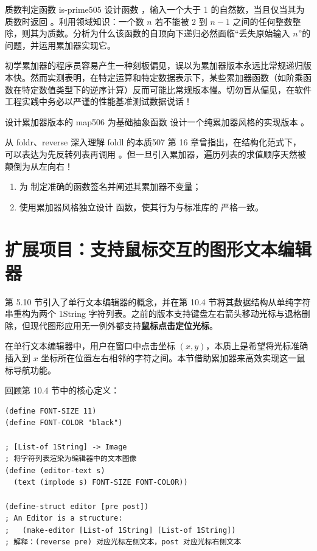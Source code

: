 \begin{exercise}{质数判定函数 is-prime}{505}
设计函数 ，输入一个大于 1 的自然数，当且仅当其为质数时返回 。利用领域知识：一个数 $n$ 若不能被 $2$ 到 $n-1$ 之间的任何整数整除，则其为质数。分析为什么该函数的自顶向下递归必然面临“丢失原始输入 $n$”的问题，并运用累加器实现它。
\end{exercise}

\begin{notebox}
初学累加器的程序员容易产生一种刻板偏见，误以为累加器版本永远比常规递归版本快。然而实测表明，在特定运算和特定数据表示下，某些累加器函数（如阶乘函数在特定数值类型下的逆序计算）反而可能比常规版本慢。切勿盲从偏见，在软件工程实践中务必以严谨的性能基准测试数据说话！
\end{notebox}

\begin{exercise}{设计累加器版本的 map}{506}
为基础抽象函数  设计一个纯累加器风格的实现版本 。
\end{exercise}

\begin{exercise}{从 foldr、reverse 深入理解 foldl 的本质}{507}
第 16 章曾指出，在结构化范式下， 可以表达为先反转列表再调用 。但一旦引入累加器，遍历列表的求值顺序天然被颠倒为从左向右！
\begin{enumerate}
  \item 为  制定准确的函数签名并阐述其累加器不变量；
  \item 使用累加器风格独立设计  函数，使其行为与标准库的  严格一致。
\end{enumerate}
\end{exercise}

\section{扩展项目：支持鼠标交互的图形文本编辑器}
\label{sec:ch32_4}

第 5.10 节引入了单行文本编辑器的概念，并在第 10.4 节将其数据结构从单纯字符串重构为两个 1String 字符列表。之前的版本支持键盘左右箭头移动光标与退格删除，但现代图形应用无一例外都支持\textbf{鼠标点击定位光标}。

在单行文本编辑器中，用户在窗口中点击坐标 $(x, y)$，本质上是希望将光标准确插入到 $x$ 坐标所在位置左右相邻的字符之间。本节借助累加器来高效实现这一鼠标导航功能。

回顾第 10.4 节中的核心定义：
\begin{lstlisting}[language=BSL]
(define FONT-SIZE 11)
(define FONT-COLOR "black")

; [List-of 1String] -> Image
; 将字符列表渲染为编辑器中的文本图像
(define (editor-text s)
  (text (implode s) FONT-SIZE FONT-COLOR))

(define-struct editor [pre post])
; An Editor is a structure:
;   (make-editor [List-of 1String] [List-of 1String])
; 解释：(reverse pre) 对应光标左侧文本，post 对应光标右侧文本
\end{lstlisting}

